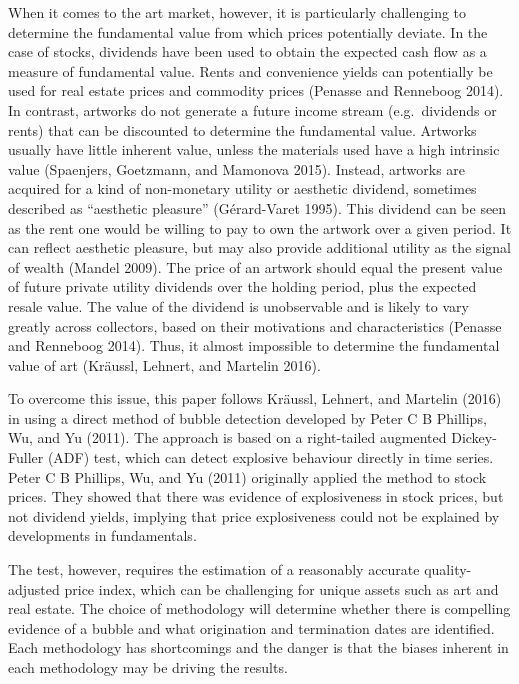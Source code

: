 \documentclass[]{elsarticle} %
\begin{document}
When it comes to the art market, however, it is particularly challenging
to determine the fundamental value from which prices potentially
deviate. In the case of stocks, dividends have been used to obtain the
expected cash flow as a measure of fundamental value. Rents and
convenience yields can potentially be used for real estate prices and
commodity prices (Penasse and Renneboog 2014). In contrast, artworks do
not generate a future income stream (e.g.~dividends or rents) that can
be discounted to determine the fundamental value. Artworks usually have
little inherent value, unless the materials used have a high intrinsic
value (Spaenjers, Goetzmann, and Mamonova 2015). Instead, artworks are
acquired for a kind of non-monetary utility or aesthetic dividend,
sometimes described as ``aesthetic pleasure'' (Gérard-Varet 1995). This
dividend can be seen as the rent one would be willing to pay to own the
artwork over a given period. It can reflect aesthetic pleasure, but may
also provide additional utility as the signal of wealth (Mandel 2009).
The price of an artwork should equal the present value of future private
utility dividends over the holding period, plus the expected resale
value. The value of the dividend is unobservable and is likely to vary
greatly across collectors, based on their motivations and
characteristics (Penasse and Renneboog 2014). Thus, it almost impossible
to determine the fundamental value of art (Kräussl, Lehnert, and
Martelin 2016).

To overcome this issue, this paper follows Kräussl, Lehnert, and
Martelin (2016) in using a direct method of bubble detection developed
by Peter C B Phillips, Wu, and Yu (2011). The approach is based on a
right-tailed augmented Dickey-Fuller (ADF) test, which can detect
explosive behaviour directly in time series. Peter C B Phillips, Wu, and
Yu (2011) originally applied the method to stock prices. They showed
that there was evidence of explosiveness in stock prices, but not
dividend yields, implying that price explosiveness could not be
explained by developments in fundamentals.

The test, however, requires the estimation of a reasonably accurate
quality-adjusted price index, which can be challenging for unique assets
such as art and real estate. The choice of methodology will determine
whether there is compelling evidence of a bubble and what origination
and termination dates are identified. Each methodology has shortcomings
and the danger is that the biases inherent in each methodology may be
driving the results.
\end{document}
